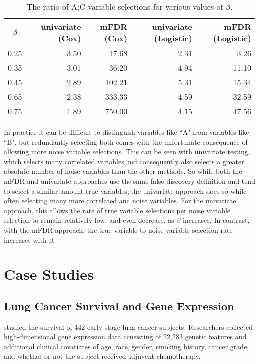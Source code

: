 \begin{table}[ht]
\centering
\begin{tabular}{c | r r r r}
  \hline
 $\beta$ & univariate (Cox) & mFDR (Cox) & univariate (Logistic) & mFDR (Logistic) \\ 
  \hline
  0.25 & 3.50 & 17.68 & 2.31 & 3.26 \\ 
  0.35 & 3.01 & 36.20 & 4.94 & 11.10 \\ 
  0.45 & 2.89 & 102.21 & 5.31 & 15.34 \\ 
  0.65 & 2.38 & 333.33 & 4.59 & 32.59 \\ 
  0.75 & 1.89 & 750.00 & 4.15 & 47.56 \\ 
   \hline
\end{tabular}
\caption{The ratio of A:C variable selections for various values of $\beta$.}
\end{table}

In practice it can be difficult to distinguish variables like ``A" from variables like ``B", but redundantly selecting both comes with the unfortunate consequence of allowing more noise variable selections. This can be seen with univariate testing, which selects many correlated variables and consequently also selects a greater absolute number of noise variables than the other methods. So while both the mFDR and univariate approaches use the same false discovery definition and tend to select a similar amount true variables, the univariate approach does so while often selecting many more correlated and noise variables. For the univariate approach, this allows the rate of true variable selections per noise variable selection to remain relatively low, and even decrease, as $\beta$ increases. In contrast, with the mFDR approach, the true variable to noise variable selection rate increases with $\beta$.  

\section{Case Studies}

\subsection{Lung Cancer Survival and Gene Expression}
\citet{Shedden2008} studied the survival of 442 early-stage lung cancer subjects. Researchers collected high-dimensional gene expression data consisting of 22,283 genetic features and additional clinical covariates of age, race, gender, smoking history, cancer grade, and whether or not the subject received adjuvent chemotherapy.  


